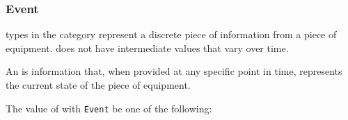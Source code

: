 \FloatBarrier

\subsubsection{Event}
\label{sec:Event}



 types in the  category represent a discrete piece of information from a piece of equipment.   does not have intermediate values that vary over time.

An  is information that, when provided at any specific point in time, represents the current state of the piece of equipment.


The value of  with  \texttt{Event} \MUST be one of the following:
